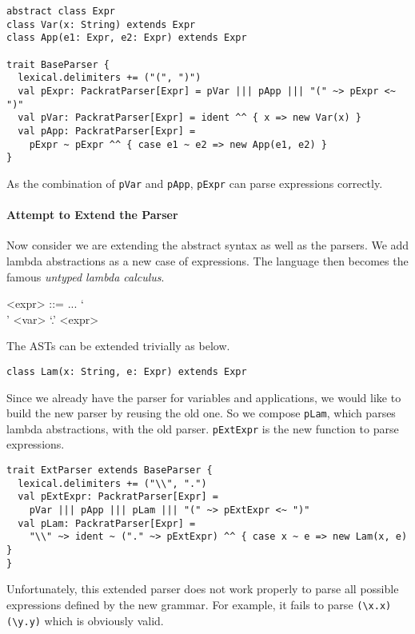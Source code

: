 \begin{lstlisting}
abstract class Expr
class Var(x: String) extends Expr
class App(e1: Expr, e2: Expr) extends Expr

trait BaseParser {
  lexical.delimiters += ("(", ")")
  val pExpr: PackratParser[Expr] = pVar ||| pApp ||| "(" ~> pExpr <~ ")"
  val pVar: PackratParser[Expr] = ident ^^ { x => new Var(x) }
  val pApp: PackratParser[Expr] =
    pExpr ~ pExpr ^^ { case e1 ~ e2 => new App(e1, e2) }
}
\end{lstlisting}

As the combination of \lstinline{pVar} and \lstinline{pApp}, \lstinline{pExpr} can parse expressions correctly.

\paragraph{Attempt to Extend the Parser} Now consider we are extending the abstract syntax as well as the parsers. We add lambda abstractions as a new case of expressions. The language then becomes the famous \textit{untyped lambda calculus}.

\setlength{\grammarindent}{5em}
\begin{grammar}
<expr> ::= ...
    \alt `\\' <var> `.' <expr>
\end{grammar}

The ASTs can be extended trivially as below.

\begin{lstlisting}
class Lam(x: String, e: Expr) extends Expr
\end{lstlisting}

Since we already have the parser for variables and applications, we would like to build the new parser by reusing the old one. So we compose \lstinline{pLam}, which parses lambda abstractions, with the old parser. \lstinline{pExtExpr} is the new function to parse expressions.

\begin{lstlisting}
trait ExtParser extends BaseParser {
  lexical.delimiters += ("\\", ".")
  val pExtExpr: PackratParser[Expr] =
    pVar ||| pApp ||| pLam ||| "(" ~> pExtExpr <~ ")"
  val pLam: PackratParser[Expr] =
    "\\" ~> ident ~ ("." ~> pExtExpr) ^^ { case x ~ e => new Lam(x, e) }
}
\end{lstlisting}

Unfortunately, this extended parser does not work properly to parse all possible expressions defined by the new grammar. For example, it fails to parse \lstinline{(\x.x)} \lstinline{(\y.y)} which is obviously valid.

